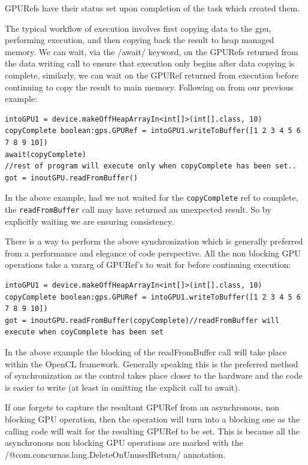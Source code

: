 \documentclass[conc-doc]{subfiles}
\begin{document}
GPURefs have their status set upon completion of the task which created them.

The typical workflow of execution involves first copying data to the gpu, performing execution, and then copying back the result to heap managed memory. We can wait, via the /await/ keyword, on the GPURefs returned from the data writing call to ensure that execution only begins after data copying is complete, similarly, we can wait on the GPURef returned from execution before continuing to copy the result to main memory. Following on from our previous example:

\begin{lstlisting}
intoGPU1 = device.makeOffHeapArrayIn<int[]>(int[].class, 10)
copyComplete boolean:gps.GPURef = intoGPU1.writeToBuffer([1 2 3 4 5 6 7 8 9 10])
await(copyComplete)
//rest of program will execute only when copyComplete has been set..
got = inoutGPU.readFromBuffer()
\end{lstlisting}

In the above example, had we not waited for the \lstinline{copyComplete} ref to complete, the \lstinline{readFromBuffer} call may have returned an unexpected result. So by explicitly waiting we are ensuring consistency.

There is a way to perform the above synchronization which is generally preferred from a performance and elegance of code perspective. All the non blocking GPU operations take a vararg of GPURef's to wait for before continuing execution:

\begin{lstlisting}
intoGPU1 = device.makeOffHeapArrayIn<int[]>(int[].class, 10)
copyComplete boolean:gps.GPURef = intoGPU1.writeToBuffer([1 2 3 4 5 6 7 8 9 10])
got = inoutGPU.readFromBuffer(copyComplete)//readFromBuffer will execute when coyComplete has been set
\end{lstlisting}

In the above example the blocking of the readFromBuffer call will take place within the OpenCL framework. Generally speaking this is the preferred method of synchronization as the control takes place closer to the hardware and the code is easier to write (at least in omitting the explicit call to await).

If one forgets to capture the resultant GPURef from an asynchronous, non blocking GPU operation, then the operation will turn into a blocking one as the calling code will wait for the resulting GPURef to be set. This is because all the asynchronous non blocking GPU operations are marked with the /@com.concurnas.lang.DeleteOnUnusedReturn/ annotation.
\end{document}

